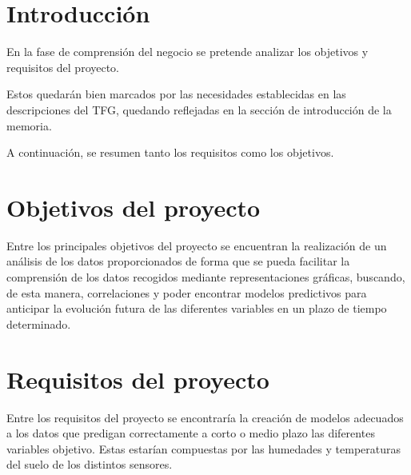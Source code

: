 
\section{Introducción}
En la fase de comprensión del negocio se pretende analizar los objetivos y requisitos del 
proyecto.

Estos quedarán bien marcados por las necesidades establecidas en las descripciones
del TFG, quedando reflejadas en la sección de introducción de la memoria.

A continuación, se resumen tanto los requisitos como los objetivos.

\section{Objetivos del proyecto}
Entre los principales objetivos del proyecto se encuentran la realización de un análisis
de los datos proporcionados de forma que se pueda facilitar la comprensión de los
datos recogidos mediante representaciones gráficas, buscando, de esta manera, correlaciones
y poder encontrar modelos predictivos para anticipar la evolución futura de las 
diferentes variables en un plazo de tiempo determinado.

\section{Requisitos del proyecto}
Entre los requisitos del proyecto se encontraría la creación de modelos adecuados a los datos
que predigan correctamente a corto o medio plazo las diferentes variables objetivo.
Estas estarían compuestas por las humedades y temperaturas del suelo de los distintos sensores.
